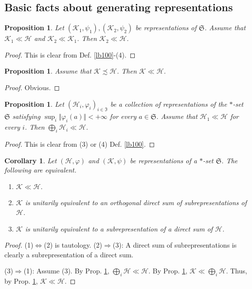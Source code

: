 \documentclass[12pt,b5paper,notitlepage]{article}
\theoremstyle{definition}
\theoremstyle{plain}
\newtheorem{pp}[df]{Proposition}
\newtheorem{co}[df]{Corollary}
\newcommand{\fk}{\mathfrak}
\newcommand{\mc}{\mathcal}
\numberwithin{equation}{section}
\begin{document}
\subsection*{Basic facts about generating representations}

\begin{pp}\label{lb76}
Let $(\mc K_1,\psi_1),(\mc K_2,\psi_2)$ be representations of $\fk S$. Assume that $\mc K_1\ll\mc H$ and $\mc K_2\ll\mc K_1$. Then $\mc K_2\ll\mc H$.
\end{pp}

\begin{proof}
This is clear from Def. \ref{lb100}-(4).
\end{proof}

\begin{pp}\label{lb77}
Assume that $\mc K\precsim\mc H$. Then $\mc K\ll\mc H$. 
\end{pp}

\begin{proof}
Obvious.
\end{proof}

\begin{pp}\label{lb78}
Let $(\mc H_i,\varphi_i)_{i\in\fk I}$ be a collection of representations of the $*$-set $\fk S$ satisfying $\sup_i\Vert\varphi_i(a)\Vert<+\infty$ for every $a\in\fk S$. Assume that $\mc H_1\ll\mc H$ for every $i$. Then $\bigoplus_i\mc H_i\ll\mc H$.
\end{pp}


\begin{proof}
This is clear from (3) or (4) Def. \ref{lb100}.
\end{proof}

\begin{co}\label{lb81}
Let $(\mc H,\varphi)$ and $(\mc K,\psi)$ be representations of a $*$-set $\fk S$. The following are equivalent.
\begin{enumerate}
\item[(1)] $\mc K\ll\mc H$.
\item[(2)] $\mc K$ is unitarily equivalent to an orthogonal direct sum of subrepresentations of $\mc H$.
\item[(3)] $\mc K$ is unitarily equivalent to a subrepresentation of a direct sum of $\mc H$. 
\end{enumerate}
\end{co}


\begin{proof}
(1)$\Leftrightarrow$(2) is tautology. (2)$\Rightarrow$(3): A direct sum of subrepresentations is clearly a subrepresentation of a direct sum.

(3)$\Rightarrow$(1): Assume (3). By Prop. \ref{lb78}, $\bigoplus_i\mc H\ll\mc H$. By Prop. \ref{lb77}, $\mc K\ll\bigoplus_i\mc H$. Thus, by Prop. \ref{lb76}, $\mc K\ll\mc H$.
\end{proof}
\end{document}

